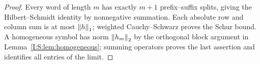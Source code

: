 \begin{proof}
Every word of length $m$ has exactly $m+1$ prefix--suffix splits, giving the Hilbert--Schmidt identity by nonnegative summation. Each absolute row and column sum is at most $\left\lVert h\right\rVert_1$; weighted Cauchy--Schwarz proves the Schur bound. A homogeneous symbol has norm $\left\lVert h_m\right\rVert_2$ by the orthogonal block argument in Lemma~\ref{I:S:lem:homogeneous}; summing operators proves the last assertion and identifies all entries of the limit.
\end{proof}
